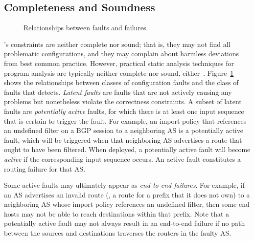 \subsection{Completeness and Soundness}


\begin{figure}[t]
\centering{}
\caption{Relationships between faults and failures.}
\label{fig:faults}
\end{figure}

\rccns's constraints are neither complete nor sound; that is, they may
not find all problematic configurations, and they may complain about
harmless deviations from best common practice.  However, practical
static analysis techniques for program analysis are typically neither
complete nor sound, either~\cite{Musuvathi2003}.
Figure~\ref{fig:faults} shows the relationships between classes
of configuration faults and the class of faults that \rcc detects.  {\em
Latent faults} are faults that are not actively causing any problems but
nonetheless violate the correctness constraints.  A subset of latent
faults are {\em potentially active} faults, for which there is at least
one input sequence that is certain to trigger the fault.  For example,
an import policy that references an undefined filter on a BGP session to
a neighboring AS is a potentially active fault, which will be triggered
when that neighboring AS advertises a route that ought to have been
filtered.  When deployed, a potentially active fault will become {\em
active} if the corresponding input sequence occurs.  An active fault
constitutes a routing failure for that AS.

Some active faults may ultimately appear as {\em end-to-end failures}.
For example, if an AS advertises an invalid route (\eg, a route for a
prefix that it does not own) to a neighboring AS whose import policy
references an undefined filter, then some end hosts may not be able to
reach destinations within that prefix.  Note that a 
potentially active fault may not always result in an end-to-end failure
if no path between the sources and destinations traverses the routers in
the faulty AS.  

